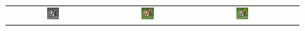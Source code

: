\documentclass[10pt,twocolumn,letterpaper]{article}
\def\acollumsize{0.14\textwidth}
\begin{document}
\begin{figure}[t!]
\begin{center}
\begin{tabular}{ cccc }
\includegraphics[width=\acollumsize]{img/result/2_in.JPEG}&
\includegraphics[width=\acollumsize]{img/result/2.png}&
\includegraphics[width=\acollumsize]{img/result/2_gt.JPEG}& \\


\end{tabular}
\end{center}
\end{figure}
\end{document}
